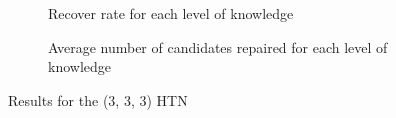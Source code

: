 \documentclass[conference]{IEEEtran}
\begin{document}
			
			\begin{figure}[t]
				\centering
				\begin{subfigure}[b]{0.5 \columnwidth}            
					\caption{ Recover rate for each level of knowledge}
					\label{Fig:Data3}
				\end{subfigure}
				\hspace{1cm}
				\begin{subfigure}[b]{0.5 \columnwidth}
					\centering
					\caption{Average number of candidates repaired for each level of knowledge}
					\label{Fig:Data4}
				\end{subfigure}
				\caption{Results for the (3, 3, 3) HTN}\label{fig:TOF}
			\end{figure}
			
\end{document}
